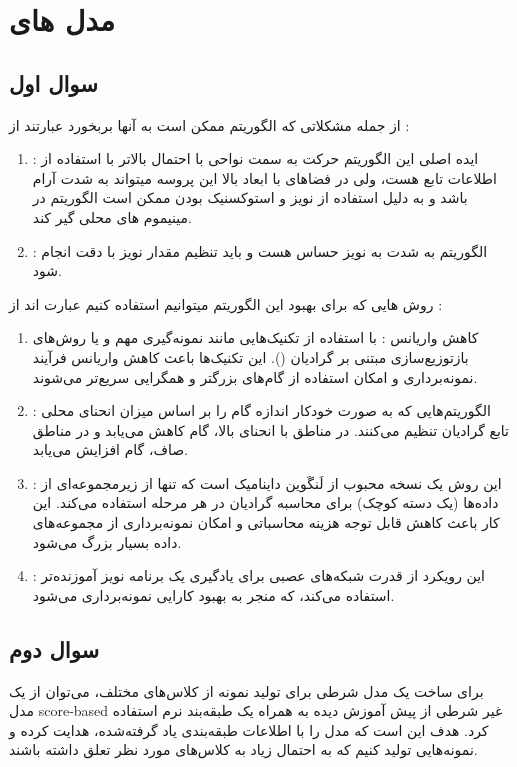 \section{مدل های }
\subsection{سوال اول}
از جمله مشکلاتی که الگوریتم  ممکن است به آنها بربخورد عبارتند از :
\begin{enumerate}
    \item {} : ایده اصلی این الگوریتم حرکت به سمت نواحی با احتمال بالاتر با استفاده از اطلاعات تابع  هست، ولی در فضاهای با ابعاد بالا این پروسه میتواند به شدت آرام باشد و به دلیل استفاده از نویز و استوکسنیک بودن ممکن است الگوریتم در مینیموم های محلی گیر کند.
    \item {} : الگوریتم  به شدت به نویز حساس هست و باید تنظیم مقدار نویز با دقت انجام شود.
\end{enumerate}
روش هایی که برای بهبود این الگوریتم میتوانیم استفاده کنیم عبارت اند از :
\begin{enumerate}
    \item کاهش واریانس :  با استفاده از تکنیک‌هایی مانند نمونه‌گیری مهم و یا روش‌های بازتوزیع‌سازی مبتنی بر گرادیان (). این تکنیک‌ها باعث کاهش واریانس فرآیند نمونه‌برداری و امکان استفاده از گام‌های بزرگتر و همگرایی سریع‌تر می‌شوند.
    \item {} : الگوریتم‌هایی که به صورت خودکار اندازه گام را بر اساس میزان انحنای محلی تابع گرادیان تنظیم می‌کنند. در مناطق با انحنای بالا، گام کاهش می‌یابد و در مناطق صاف، گام افزایش می‌یابد.
    \item {} :  این روش یک نسخه محبوب از لَنگَوین داینامیک است که تنها از زیرمجموعه‌ای از داده‌ها (یک دسته کوچک) برای محاسبه گرادیان در هر مرحله استفاده می‌کند. این کار باعث کاهش قابل توجه هزینه محاسباتی و امکان نمونه‌برداری از مجموعه‌های داده بسیار بزرگ می‌شود.
    \item {} :  این رویکرد از قدرت شبکه‌های عصبی برای یادگیری یک برنامه نویز آموزنده‌تر استفاده می‌کند، که منجر به بهبود کارایی نمونه‌برداری می‌شود.
\end{enumerate}

\subsection{سوال دوم}
برای ساخت یک مدل شرطی برای تولید نمونه از کلاس‌های مختلف، می‌توان از یک مدل score-based غیر شرطی از پیش آموزش دیده به همراه یک طبقه‌بند نرم  استفاده کرد. هدف این است که مدل  را با اطلاعات طبقه‌بندی یاد گرفته‌شده، هدایت کرده و نمونه‌هایی تولید کنیم که به احتمال زیاد به کلاس‌های مورد نظر تعلق داشته باشند.

